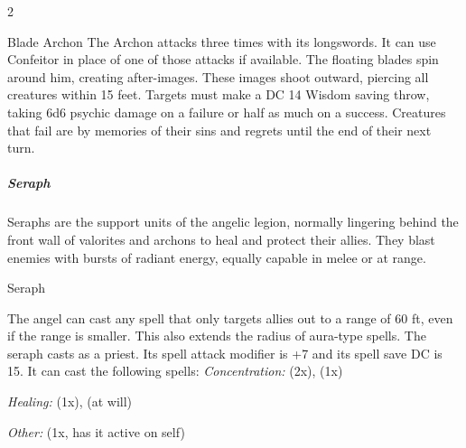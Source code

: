 \begin{multicols}{2}
\begin{DndMonster}{Blade Archon}
	 The Archon attacks three times with its longswords. It can use Confeitor in place of one of those attacks if available.
	\DndMonsterAttack[
		name=Floating Longsword,
		distance=both,
		type=weapon,
		mod=+7,
		reach=20 ft.,
		dmg=\DndDice{1d10+4},
		dmg-type=slashing,
		plus-dmg=\DndDice{1d8},
		plus-dmg-type=radiant
	]
	 The floating blades spin around him, creating after-images. These images shoot outward, piercing all creatures within 15 feet. Targets must make a DC 14 Wisdom saving throw, taking 6d6 psychic damage on a failure or half as much on a success. Creatures that fail are  by memories of their sins and regrets until the end of their next turn.
\end{DndMonster}

\subparagraph*{Seraph}
Seraphs are the support units of the angelic legion, normally lingering behind the front wall of valorites and archons to heal and protect their allies. They blast enemies with bursts of radiant energy, equally capable in melee or at range.

\begin{DndMonster}{Seraph}
    \DndMonsterBasics[
        armor-class={16 (chain)},
        hit-points={104 (16d8 + 32)},
        speed={30 ft., 90 ft. fly}
    ]
    \DndMonsterDetails[
        skills={--},
        senses={darkvision 120 ft, passive perception 14},
        languages={celestial, lucian},
        challenge={5:5},
        damage-immunities={--},
        damage-resistances={radiant},
        damage-vulnerabilities={--}
    ]

     The angel can cast any spell that only targets allies out to a range of 60 ft, even if the range is smaller. This also extends the radius of aura-type spells.
     The seraph casts as a priest. Its spell attack modifier is +7 and its spell save DC is 15. It can cast the following spells:
    \textit{Concentration:}  (2x),  (1x)

    \textit{Healing:}  (1x),  (at will)

    \textit{Other:}  (1x, has it active on self)


\end{DndMonster}
\end{multicols}
